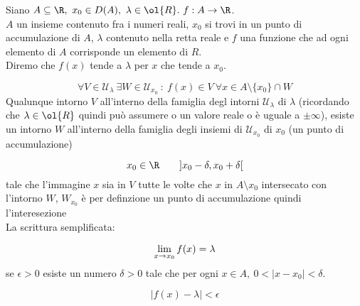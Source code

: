 \documentclass[../analisi.tex]{subfiles}
\begin{document}
\begin{defn}
Siano $\acr,\ x_0 \in D(A),\ \lambda \in \ol{R}.\ f: A \to \R$.\\
$A$ un insieme contenuto fra i numeri reali, 
$x_0$ si trovi in un punto di accumulazione di $A$, 
$\lambda$ contenuto nella retta reale  e $f$ una funzione che ad ogni 
elemento di $A$ corrisponde un elemento di $R$.\\
Diremo che $f(x)$ tende a $\lambda$ per $x$ che tende a $x_0$.


\begin{equation}
	\forall V \in \mathcal{U}_\lambda\ \exists W \in \mathcal{U}_{x_0}\ :\
	f(x) \in V\ \forall x \in A \setminus \{ x_0 \}\cap W
\end{equation}
Qualunque intorno $V$ all'interno della famiglia degl intorni $\mathcal{U}_\lambda$
di $\lambda$ (ricordando che $\lambda \in \ol{R}$ quindi può assumere o
un valore reale o è uguale a  $ \pm \infty$), esiste un intorno $W$ all'interno
della famiglia degli insiemi di $\mathcal{U}_{x_0}$ di $x_0$ (un punto di 
accumulazione) 

\begin{equation}
	x_0 \in \R \qquad ] x_0 - \delta, x_0 + \delta [
\end{equation}
 tale che l'immagine $x$  sia in $V$ tutte le volte che $x$ in $A \setminus
 {x_0}$ intersecato con l'intorno $W$, $W_{x_0}$ è per definzione un punto
 di accumulazione quindi l'interesezione \bt{è non vuota}\\
La scrittura semplificata:


\begin{equation}
	\lim \limits_{x \to x_0} f(x) = \lambda
\end{equation}
se  $ \epsilon > 0 $ esiste un numero $\delta > 0$ tale che per ogni
$ x \in A, \ 0 < | x - x_0 | < \delta$.

\begin{equation}
	| f(x) - \lambda | < \epsilon 
\end{equation}
\end{defn}
\end{document}
